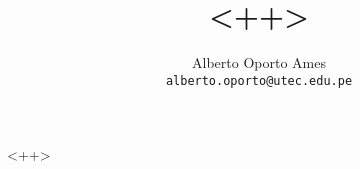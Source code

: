 \documentclass[12pt, twoside]{article}
\title{\textbf{<++>}}
\author{
		Alberto Oporto Ames\\
		\texttt{alberto.oporto@utec.edu.pe}\\
		}
\begin{document}
\maketitle
\thispagestyle{fancy}

<++>
\end{document}
